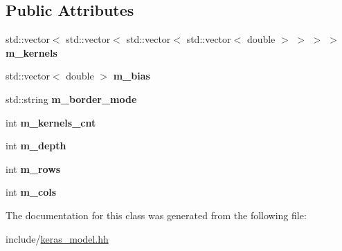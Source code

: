 \subsection*{Public Attributes}
\begin{DoxyCompactItemize}
\item 
\mbox{\label{classkeras_1_1_layer_conv2_d_a281eba38468017667fc263f5f398ac64}} 
std\+::vector$<$ std\+::vector$<$ std\+::vector$<$ std\+::vector$<$ double $>$ $>$ $>$ $>$ {\bfseries m\+\_\+kernels}
\item 
\mbox{\label{classkeras_1_1_layer_conv2_d_a2c31ea78bb25fc5e38e9b2759f36b768}} 
std\+::vector$<$ double $>$ {\bfseries m\+\_\+bias}
\item 
\mbox{\label{classkeras_1_1_layer_conv2_d_a1592bb3bcffbbcc8a610c418c289e05f}} 
std\+::string {\bfseries m\+\_\+border\+\_\+mode}
\item 
\mbox{\label{classkeras_1_1_layer_conv2_d_ab2e0971eb185b34aa10487b666866194}} 
int {\bfseries m\+\_\+kernels\+\_\+cnt}
\item 
\mbox{\label{classkeras_1_1_layer_conv2_d_a89695c3b41f2d52253eece3929647dab}} 
int {\bfseries m\+\_\+depth}
\item 
\mbox{\label{classkeras_1_1_layer_conv2_d_aefaf8276a9171a2dd04e5c94512e549d}} 
int {\bfseries m\+\_\+rows}
\item 
\mbox{\label{classkeras_1_1_layer_conv2_d_a1ff200ecdc9196e986924a187c22219d}} 
int {\bfseries m\+\_\+cols}
\end{DoxyCompactItemize}


The documentation for this class was generated from the following file\+:\begin{DoxyCompactItemize}
\item 
include/\mbox{\hyperlink{keras__model_8hh}{keras\+\_\+model.\+hh}}\end{DoxyCompactItemize}
